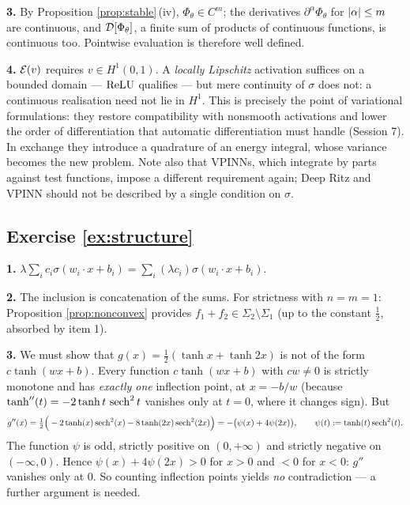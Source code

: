 \documentclass[11pt,a4paper]{article}
\begin{document}
\textbf{3.} By Proposition \ref{prop:stable}\,(iv), $\Phi_\theta \in C^m$; the derivatives
$\partial^\alpha \Phi_\theta$ for $\left\lvert \alpha \right\rvert \le m$ are continuous, and $\mathcal{D}[\Phi_\theta]$, a
finite sum of products of continuous functions, is continuous too. Pointwise evaluation is therefore
well defined.

\textbf{4.} $\mathcal{E}(v)$ requires $v \in H^1(0,1)$. A \emph{locally Lipschitz} activation suffices on a
bounded domain --- $\operatorname{ReLU}$ qualifies --- but mere continuity of $\sigma$ does not: a continuous
realisation need not lie in $H^1$. This is precisely the point of variational formulations: they
restore compatibility with nonsmooth activations and lower the order of differentiation that
automatic differentiation must handle (Session 7). In exchange they introduce a quadrature of an
energy integral, whose variance becomes the new problem. Note also that VPINNs, which integrate by
parts against test functions, impose a different requirement again; Deep Ritz and VPINN should not
be described by a single condition on $\sigma$.

\subsection*{Exercise \ref{ex:structure}}

\textbf{1.} $\lambda \sum_i c_i \sigma(w_i\cdot x + b_i) = \sum_i (\lambda c_i)\sigma(w_i \cdot x+b_i)$.

\textbf{2.} The inclusion is concatenation of the sums. For strictness with $n = m = 1$:
Proposition \ref{prop:nonconvex} provides $f_1 + f_2 \in \Sigma_2 \setminus \Sigma_1$ (up to the
constant $\tfrac12$, absorbed by item 1).

\textbf{3.} We must show that $g(x) = \tfrac12(\tanh x + \tanh 2x)$ is not of the form
$c\tanh(wx+b)$. Every function $c\tanh(wx+b)$ with $cw \ne 0$ is strictly monotone and has
\emph{exactly one} inflection point, at $x = -b/w$ (because $\tanh''(t) = -2\tanh t\,\operatorname{sech}^2 t$
vanishes only at $t = 0$, where it changes sign). But
\[
g''(x) = \tfrac12\Big( -2\tanh(x)\operatorname{sech}^2(x) - 8 \tanh(2x)\operatorname{sech}^2(2x) \Big) = -\big(\psi(x) + 4\psi(2x)\big),
\qquad \psi(t) := \tanh(t)\operatorname{sech}^2(t).
\]
The function $\psi$ is odd, strictly positive on $(0,+\infty)$ and strictly negative on
$(-\infty,0)$. Hence $\psi(x) + 4\psi(2x) > 0$ for $x > 0$ and $< 0$ for $x < 0$: $g''$ vanishes
only at $0$. So counting inflection points yields \emph{no} contradiction --- a further argument is
needed.
\end{document}
